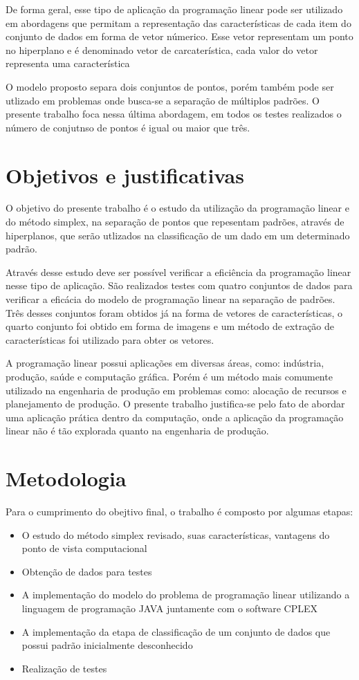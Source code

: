 De forma geral, esse tipo de aplicação da programação linear pode ser utilizado em abordagens que permitam a representação das características de cada item do conjunto de dados em forma de vetor númerico. Esse vetor representam um ponto no hiperplano e é denominado vetor de carcaterística, cada valor do vetor representa uma característica

O modelo proposto separa dois conjuntos de pontos, porém também pode ser utlizado em problemas onde busca-se a separação de múltiplos padrões. O presente trabalho foca nessa última abordagem, em todos os testes realizados o número de conjutnso de pontos é igual ou maior que três.

\section{Objetivos e justificativas}
O objetivo do presente trabalho é o estudo da utilização da programação linear e do método simplex, na separação de pontos que repesentam padrões, através de hiperplanos, que serão utlizados na classificação de um dado em um determinado padrão.

Através desse estudo deve ser possível verificar a eficiência da programação linear nesse tipo de aplicação. São realizados testes com quatro conjuntos de dados para verificar a eficácia do modelo de programação linear na separação de padrões. Três desses conjuntos foram obtidos já na forma de vetores de características, o quarto conjunto foi obtido em forma de imagens e um método de extração de características foi utilizado para obter os vetores.

A programação linear possui aplicações em diversas áreas, como: indústria, produção, saúde e computação gráfica. Porém é um método mais comumente utilizado na engenharia de produção em problemas como: alocação de recursos e planejamento de produção. O presente trabalho justifica-se pelo fato de abordar uma aplicação prática dentro da computação, onde a aplicação da programação linear não é tão explorada quanto na engenharia de produção.

\section{Metodologia}
Para o cumprimento do obejtivo final, o trabalho é composto por algumas etapas:

\begin{itemize} 
\item O estudo do método simplex revisado, suas características, vantagens do ponto de vista computacional
\item Obtenção de dados para testes
\item A implementação do modelo do problema de programação linear utilizando a linguagem de programação JAVA juntamente com o software CPLEX
\item A implementação da etapa de classificação de um conjunto de dados que possui padrão inicialmente desconhecido
\item Realização de testes 
\end{itemize}

